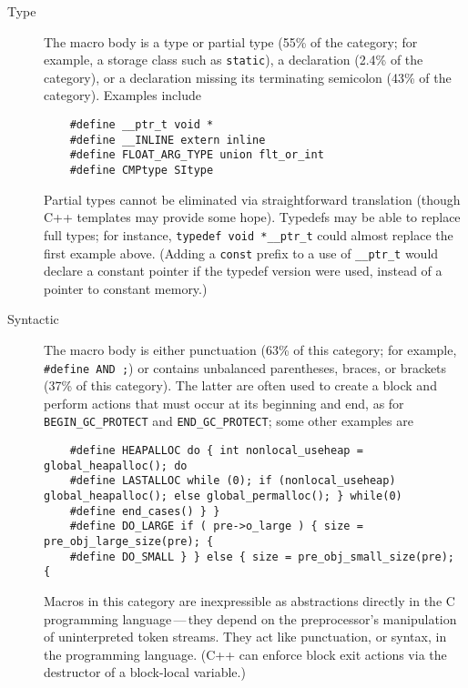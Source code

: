 \documentclass[10pt]{article}
\begin{document}
\begin{description}
\item[Type] 
  The macro body is a type or partial type (55\% of the category; for
  example, a storage class such as {\tt static}), a declaration
  (2.4\% of the category), or a declaration missing its terminating
  semicolon (43\% of the category).  Examples include
\begin{verbatim}
    #define __ptr_t void *
    #define __INLINE extern inline
    #define FLOAT_ARG_TYPE union flt_or_int
    #define CMPtype SItype
\end{verbatim}
  Partial types cannot be eliminated via straightforward translation
  (though C++ templates may provide some hope).  Typedefs may be able to
  replace full types; for instance, {\tt typedef void \verb|*__ptr_t|} could
  almost replace the first example above.  (Adding a \verb|const| prefix
  to a use of \verb|__ptr_t| would declare a constant pointer if the typedef
  version were used, instead of a pointer to constant memory.)


\item[Syntactic]  The macro body is either punctuation (63\% of this
  category; for example, {\tt \#define AND ;}) or contains unbalanced
  parentheses, braces, or brackets (37\% of this category).  The latter are
  often used to create a block and perform actions that must occur at its
  beginning and end, as for \verb|BEGIN_GC_PROTECT| and
  \verb|END_GC_PROTECT|; some other examples are 
\begin{verbatim}
    #define HEAPALLOC do { int nonlocal_useheap = global_heapalloc(); do
    #define LASTALLOC while (0); if (nonlocal_useheap) global_heapalloc(); else global_permalloc(); } while(0)
    #define end_cases() } }
    #define DO_LARGE if ( pre->o_large ) { size = pre_obj_large_size(pre); {
    #define DO_SMALL } } else { size = pre_obj_small_size(pre); {
\end{verbatim}
  Macros in this category are inexpressible as
  abstractions directly in the C programming language\,---\,they depend on the
  preprocessor's manipulation of uninterpreted token streams.  They act
  like punctuation, or syntax, in the programming language.  (C++ can
  enforce block exit actions via the destructor of a block-local variable.)



\end{description}
\end{document}

